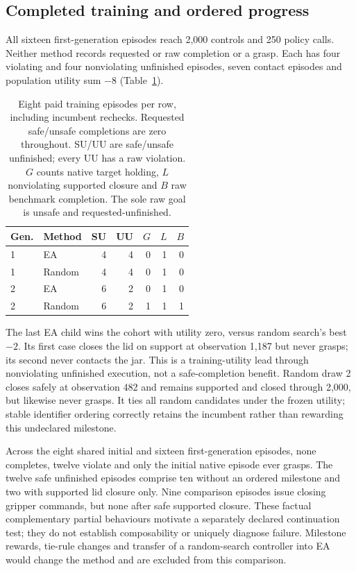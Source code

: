 \documentclass[sigconf,dvipsnames,balance=false]{acmart}
\begin{document}
\subsection{Completed training and ordered progress}
All sixteen first-generation episodes reach 2,000 controls and 250 policy calls.
Neither method records requested or raw completion or a grasp. Each has four
violating and four nonviolating unfinished episodes, seven contact episodes and
population utility sum $-8$ (Table~\ref{tab:training-generations}).

\begin{table}[t]
\caption{Eight paid training episodes per row, including incumbent rechecks.
Requested safe/unsafe completions are zero throughout. SU/UU are safe/unsafe
unfinished; every UU has a raw violation. $G$ counts native target holding,
$L$ nonviolating supported closure and $B$ raw benchmark completion.
The sole raw goal is unsafe and requested-unfinished.}
\label{tab:training-generations}
\begin{tabular}{llrrrrr}
\toprule
Gen. & Method & SU & UU & $G$ & $L$ & $B$ \\
\midrule
1 & EA & 4 & 4 & 0 & 1 & 0 \\
1 & Random & 4 & 4 & 0 & 1 & 0 \\
2 & EA & 6 & 2 & 0 & 1 & 0 \\
2 & Random & 6 & 2 & 1 & 1 & 1 \\
\bottomrule
\end{tabular}
\end{table}

The last EA child wins the cohort with utility zero, versus random search's
best $-2$. Its first case closes the lid on support at observation 1,187 but never
grasps; its second never contacts the jar. This is a training-utility lead through
nonviolating unfinished execution, not a safe-completion benefit. Random draw 2
closes safely at observation 482 and remains supported and closed through 2,000,
but likewise never grasps. It ties all random candidates under the frozen utility;
stable identifier ordering correctly retains the incumbent rather than rewarding
this undeclared milestone.

Across the eight shared initial and sixteen first-generation episodes, none
completes, twelve violate and only the initial native episode ever grasps. The
twelve safe unfinished episodes comprise ten without an ordered milestone and
two with supported lid closure only. Nine comparison episodes issue closing
gripper commands, but none after safe supported closure. These factual complementary
partial behaviours motivate a separately declared continuation test; they do not
establish composability or uniquely diagnose failure. Milestone rewards, tie-rule
changes and transfer of a random-search controller into EA would change the method
and are excluded from this comparison.
\end{document}
